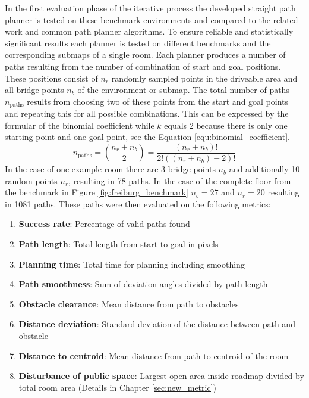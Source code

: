 In the first evaluation phase of the iterative process the developed straight path planner is tested on these benchmark environments and compared to the related work and common path planner algorithms. To ensure reliable and statistically significant results each planner is tested on different benchmarks and the corresponding submaps of a single room. Each planner produces a number of paths resulting from the number of combination of start and goal positions. These positions consist of \(n_r\) randomly sampled points in the driveable area and all bridge points \(n_b\) of the environment or submap. The total number of paths \(n_{\text{paths}}\) results from choosing two of these points from the start and goal points and repeating this for all possible combinations. This can be expressed by the formular of the binomial coefficient while \(k\) equals 2 because there is only one starting point and one goal point, see the Equation \ref{equ:binomial_coefficient}.
\begin{equation} \label{equ:binomial_coefficient}
    n_{\text{paths}} = \binom{n_r + n_b}{2} = \frac{(n_r + n_b)!}{2! ((n_r + n_b)-2)!}
\end{equation}
In the case of one example room there are 3 bridge points \(n_b\) and additionally 10 random points \(n_r\), resulting in 78 paths. In the case of the complete floor from the benchmark in Figure \ref{fig:freiburg_benchmark} \(n_b = 27\) and \(n_r = 20\) resulting in 1081 paths. These paths were then evaluated on the following metrics:
\begin{enumerate}
  \item \textbf{Success rate}: Percentage of valid paths found
  \item \textbf{Path length}: Total length from start to goal in pixels
  \item \textbf{Planning time}: Total time for planning including smoothing
  \item \textbf{Path smoothness}: Sum of deviation angles divided by path length
  \item \textbf{Obstacle clearance}: Mean distance from path to obstacles
  \item \textbf{Distance deviation}: Standard deviation of the distance between path and obstacle
  \item \textbf{Distance to centroid}: Mean distance from path to centroid of the room
  \item \textbf{Disturbance of public space}: Largest open area inside roadmap divided by total room area (Details in Chapter \ref{sec:new_metric})
\end{enumerate}

